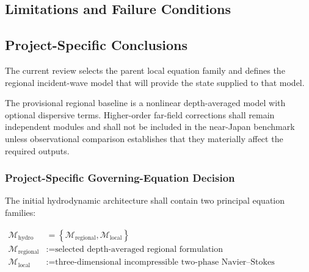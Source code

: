 
\subsection{Limitations and Failure Conditions}
\label{sec:res-mod-eqs-limitations}


\subsection{Project-Specific Conclusions}
\label{sec:res-mod-eqs-conclusions}


The current review selects the parent local equation family and defines
the regional incident-wave model that will provide the state supplied
to that model.

The provisional regional baseline is a nonlinear depth-averaged model
with optional dispersive terms. Higher-order far-field corrections
shall remain independent modules and shall not be included in the
near-Japan benchmark unless observational comparison establishes that
they materially affect the required outputs.

\subsubsection{Project-Specific Governing-Equation Decision}
\label{sec:res-mod-eqs-local-project-decision}

The initial hydrodynamic architecture shall contain two principal
equation families:

\begin{align}
  \mathcal{M}_{\mathrm{hydro}}
  &=
  \left\{
    \mathcal{M}_{\mathrm{regional}},
    \mathcal{M}_{\mathrm{local}}
  \right\}
  \label{eq:res-mod-eqs-two-model-architecture}
  \\
  \mathcal{M}_{\mathrm{regional}}
  &:=
  \text{selected depth-averaged regional formulation}
  \label{eq:res-mod-eqs-regional-model-definition}
  \\
  \mathcal{M}_{\mathrm{local}}
  &:=
  \text{three-dimensional incompressible two-phase
  Navier--Stokes formulation}
  \label{eq:res-mod-eqs-local-model-definition}
\end{align}

